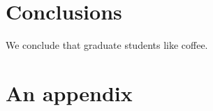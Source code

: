 \documentclass{uiucthesis2021}
\begin{document}
% 
% 
% 
% 

\chapter{Conclusions}

We conclude that graduate students like coffee.


\backmatter

\printbibliography[heading=bibintoc,title={References}]

\mainmatter  %

\appendix

\chapter{An appendix}

\lipsum[1-5]

% 
\end{document}
